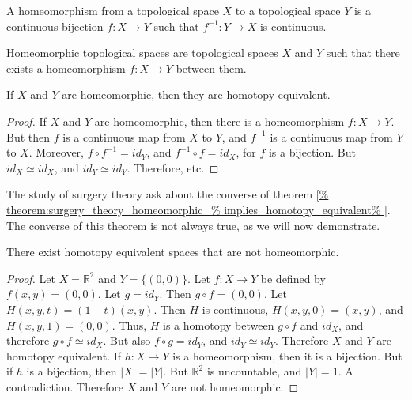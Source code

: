 \documentclass[crop=false,class=article,oneside]{standalone}
\begin{document}
        \begin{definition}
            A homeomorphism from a topological space $X$ to a
            topological space $Y$ is a continuous bijection
            $f:{X}\rightarrow{Y}$ such that
            $f^{-1}:{Y}\rightarrow{X}$ is continuous.
        \end{definition}
        \begin{definition}
            Homeomorphic topological spaces are topological
            spaces $X$ and $Y$ such that there
            exists a homeomorphism
            $f:{X}\rightarrow{Y}$ between them.
        \end{definition}
        \begin{theorem}
            \label{%
                theorem:surgery_theory_homeomorphic_%
                implies_homotopy_equivalent%
            }
            If $X$ and $Y$ are homeomorphic, then they
            are homotopy equivalent.
        \end{theorem}
        \begin{proof}
            If $X$ and $Y$ are homeomorphic, then there is a
            homeomorphism $f:X\rightarrow Y$. But then $f$ is a
            continuous map from $X$ to $Y$, and $f^{-1}$ is a
            continuous map from $Y$ to $X$. Moreover,
            ${f}\circ{f^{-1}}=id_{Y}$, and
            ${f^{-1}}\circ{f}=id_{X}$,
            for $f$ is a bijection. But
            ${id_{X}}\simeq{id_{X}}$,
            and ${id_{Y}}\simeq{id_{Y}}$. Therefore, etc.
        \end{proof}
        The study of surgery theory ask about the
        converse of theorem
        \ref{%
            theorem:surgery_theory_homeomorphic_%
            implies_homotopy_equivalent%
        }.
        The converse of this theorem is not always true,
        as we will now demonstrate.
        \begin{theorem}
            \label{%
                theorem:surgery_theory_homotopic_does_%
                not_imply_homeomorphic%
            }
            There exist homotopy equivalent spaces
            that are not homeomorphic.
        \end{theorem}
        \begin{proof}
            Let $X=\mathbb{R}^{2}$ and $Y=\{(0,0)\}$.
            Let $f:{X}\rightarrow{Y}$ be defined by
            $f(x,y)=(0,0)$. Let $g=id_{Y}$. Then
            $g\circ{f}=(0,0)$. Let $H(x,y,t)=(1-t)(x,y)$.
            Then $H$ is continuous, $H(x,y,0)=(x,y)$,
            and $H(x,y,1)=(0,0)$. Thus, $H$ is a
            homotopy between ${g}\circ{f}$ and $id_{X}$, and
            therefore ${g}\circ{f}\simeq{id_{X}}$. But also
            ${f}\circ{g}=id_{Y}$, and
            ${id_{Y}}\simeq{id_{Y}}$.
            Therefore $X$ and $Y$ are homotopy equivalent.
            If $h:{X}\rightarrow{Y}$ is a
            homeomorphism, then it is a bijection. But if $h$
            is a bijection, then $|X|=|Y|$. But
            $\mathbb{R}^{2}$ is uncountable, and $|Y|=1$. A
            contradiction. Therefore $X$ and $Y$ are
            not homeomorphic.
        \end{proof}
\end{document}
